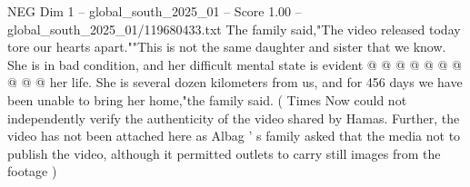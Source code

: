 \begin{textsample}{NEG Dim 1 – global\_south\_2025\_01 – Score 1.00 – global\_south\_2025\_01/119680433.txt}
The family said,"The video released today tore our hearts apart.""This is not the same daughter and sister that we know.
She is in bad condition, and her difficult mental state is evident @ @ @ @ @ @ @ @ @ @ her life.
She is several dozen kilometers from us, and for 456 days we have been unable to bring her home,"the family said. ( Times Now could not independently verify the authenticity of the video shared by Hamas.
Further, the video has not been attached here as Albag ' s family asked that the media not to publish the video, although it permitted outlets to carry still images from the footage )

\end{textsample}
